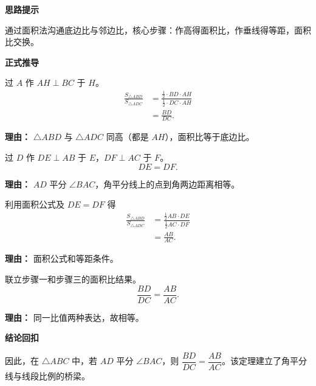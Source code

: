 \begin{proofbox}
	\textbf{\textcolor{CProof}{思路提示}}

	通过面积法沟通底边比与邻边比，核心步骤：作高得面积比，作垂线得等距，面积比交换。

	\medskip
	\textbf{\textcolor{CProof}{正式推导}}
	\begin{description}[style=nextline, leftmargin=2.8em, labelsep=0.5em, itemsep=0.55em]
		\item[\textbf{步骤一（作高导比例）：}] 过 $A$ 作 $AH \perp BC$ 于 $H$。
			\[
				\begin{aligned}
					\frac{S_{\triangle ABD}}{S_{\triangle ADC}} &= \frac{\frac12 \cdot BD \cdot AH}{\frac12 \cdot DC \cdot AH} \\
					&= \frac{BD}{DC}.
			\end{aligned}
			\]
			\par\textbf{理由：} $\triangle ABD$ 与 $\triangle ADC$ 同高（都是 $AH$），面积比等于底边比。

		\item[\textbf{步骤二（作垂线等距）：}] 过 $D$ 作 $DE \perp AB$ 于 $E$，$DF \perp AC$ 于 $F$。
			\[
				DE = DF.
			\]
			\par\textbf{理由：} $AD$ 平分 $\angle BAC$，角平分线上的点到角两边距离相等。

		\item[\textbf{步骤三（面积比例转化）：}] 利用面积公式及 $DE=DF$ 得
			\[
				\begin{aligned}
					\frac{S_{\triangle ABD}}{S_{\triangle ADC}} &= \frac{\frac12 AB\cdot DE}{\frac12 AC\cdot DF} \\
					&= \frac{AB}{AC}.
			\end{aligned}
			\]
			\par\textbf{理由：} 面积公式和等距条件。

		\item[\textbf{步骤四（等量代换得结论）：}] 联立步骤一和步骤三的面积比结果。
			\[
				\frac{BD}{DC} = \frac{AB}{AC}.
			\]
			\par\textbf{理由：} 同一比值两种表达，故相等。
	\end{description}

	\medskip
	\textbf{\textcolor{CProof}{结论回扣}}

	因此，在 $\triangle ABC$ 中，若 $AD$ 平分 $\angle BAC$，则 $\dfrac{BD}{DC} = \dfrac{AB}{AC}$。该定理建立了角平分线与线段比例的桥梁。
\end{proofbox}
